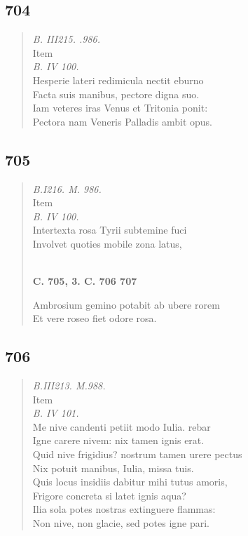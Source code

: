 \documentclass[11pt, a4paper]{report}
\begin{document}
            \subsection*{704}
      \begin{verse}
      \textit{B. III215. .986.} \\  \lbrack Item \rbrack  \\ \textit{B. IV 100.} \\ Hesperie lateri redimicula nectit eburno \\ Facta suis manibus, pectore digna suo. \\ Iam veteres iras Venus et Tritonia ponit: \\ Pectora nam Veneris Palladis ambit opus. \\ 
      \end{verse}
  
            \subsection*{705}
      \begin{verse}
      \textit{B.I216. M. 986.} \\  \lbrack Item \rbrack  \\ \textit{B. IV 100.} \\ Intertexta rosa Tyrii subtemine fuci \\ Involvet quoties mobile zona latus, \\ 
        ﻿\pagebreak 
    \begin{center} \textbf{C. 705, 3. C. 706 707} \end{center} \marginpar{[173]} Ambrosium gemino potabit ab ubere rorem \\ Et vere roseo fiet odore rosa. \\ 
      \end{verse}
  
            \subsection*{706}
      \begin{verse}
      \textit{B.III213. M.988.} \\ Item \\ \textit{B. IV 101.} \\ Me nive candenti petiit modo Iulia. rebar \\ Igne carere nivem: nix tamen ignis erat. \\ Quid nive frigidius? nostrum tamen urere pectus \\ Nix potuit manibus, Iulia, missa tuis. \\ Quis locus insidiis dabitur mihi tutus amoris, \\ Frigore concreta si latet ignis aqua? \\ Ilia sola potes nostras extinguere flammas: \\ Non nive, non glacie, sed potes igne pari. \\ 
      \end{verse}
  
\end{document}

